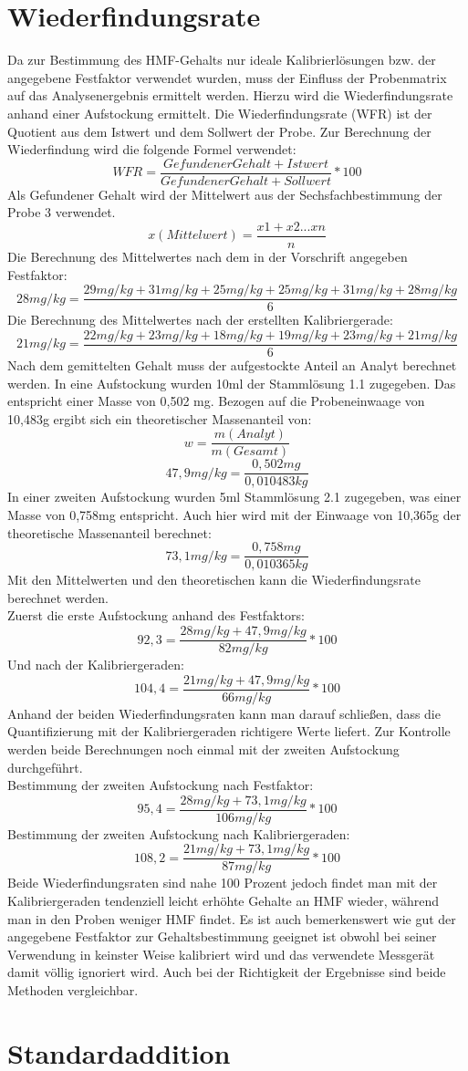 \section{Wiederfindungsrate}
Da zur Bestimmung des HMF-Gehalts nur ideale Kalibrierlösungen bzw. der angegebene Festfaktor verwendet wurden, muss der Einfluss der Probenmatrix auf das Analysenergebnis ermittelt werden. Hierzu wird die Wiederfindungsrate anhand einer Aufstockung ermittelt. Die Wiederfindungsrate (WFR) ist der Quotient aus dem Istwert und dem Sollwert der Probe. Zur Berechnung der Wiederfindung wird die folgende Formel verwendet:
	\[WFR=\frac{ Gefundener Gehalt + Istwert }{ Gefundener Gehalt + Sollwert } *100 \]
Als Gefundener Gehalt wird der Mittelwert aus der Sechsfachbestimmung der Probe 3 verwendet.
	\[x(Mittelwert)=\frac{ x1+x2...xn }{ n } \]
Die Berechnung des Mittelwertes nach dem in der Vorschrift angegeben  Festfaktor:
	\[28mg/kg=\frac{ 29mg/kg+31mg/kg+25mg/kg+25mg/kg+31mg/kg+28mg/kg }{ 6 } \]
Die Berechnung des Mittelwertes nach der erstellten Kalibriergerade:
	\[21mg/kg=\frac{ 22mg/kg+23mg/kg+18mg/kg+19mg/kg+23mg/kg+21mg/kg }{ 6 } \]
Nach dem gemittelten Gehalt muss der aufgestockte Anteil an Analyt berechnet werden. In eine Aufstockung wurden 10ml der Stammlösung 1.1 zugegeben. Das entspricht einer Masse von 0,502 mg. Bezogen auf die Probeneinwaage von 10,483g ergibt sich ein theoretischer Massenanteil von:  
	\[w=\frac{ m(Analyt) }{ m(Gesamt) } \]
	\[47,9mg/kg=\frac{ 0,502mg }{ 0,010483kg } \]
In einer zweiten Aufstockung wurden 5ml Stammlösung 2.1 zugegeben, was einer Masse von 0,758mg entspricht. Auch hier wird mit der Einwaage von 10,365g der theoretische Massenanteil berechnet:
	\[73,1mg/kg=\frac{ 0,758mg }{ 0,010365kg } \]
Mit den Mittelwerten und den theoretischen kann die Wiederfindungsrate berechnet werden.\\
Zuerst die erste Aufstockung anhand des Festfaktors:
	\[92,3=\frac{ 28mg/kg + 47,9mg/kg }{ 82mg/kg } *100 \]
Und nach der Kalibriergeraden:
	\[104,4=\frac{ 21mg/kg + 47,9mg/kg }{ 66mg/kg } *100 \]
Anhand der beiden Wiederfindungsraten kann man darauf schließen, dass die Quantifizierung mit der Kalibriergeraden richtigere Werte liefert. Zur Kontrolle werden beide Berechnungen noch einmal mit der zweiten Aufstockung durchgeführt.\\
Bestimmung der zweiten Aufstockung nach Festfaktor:
	\[95,4=\frac{ 28mg/kg + 73,1mg/kg }{ 106mg/kg } *100 \]
Bestimmung der zweiten Aufstockung nach Kalibriergeraden:
	\[108,2=\frac{ 21mg/kg + 73,1mg/kg }{ 87mg/kg } *100 \]
Beide Wiederfindungsraten sind nahe 100 Prozent jedoch findet man mit der Kalibriergeraden tendenziell leicht erhöhte Gehalte an HMF wieder, während man in den Proben weniger HMF findet. Es ist auch bemerkenswert wie gut der angegebene Festfaktor zur Gehaltsbestimmung geeignet ist obwohl bei seiner Verwendung in keinster Weise kalibriert wird und das verwendete Messgerät damit völlig ignoriert wird. Auch bei der Richtigkeit der Ergebnisse sind beide Methoden vergleichbar.
	
\section{Standardaddition}